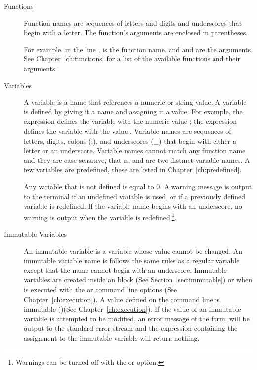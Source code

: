 \begin{description}

\item[Functions] Function names are sequences of letters and digits and underscores
\cmd{(\_)} that begin with a letter. The function's arguments are
enclosed in parentheses.

For example, in the line ,  is the
function name, and  and are the arguments. See
Chapter~\ref{ch:functions} for a list of the available functions and
their arguments.

\item[Variables] A variable is a name that references a numeric or string 
value. A variable is defined by giving it a name and assigning it a value. For 
example, the expression  defines the variable  with 
the numeric value ; the expression  
defines the variable  with the value . 
Variable names are sequences of letters, digits, colons (:), and underscores (\_) that begin 
with either a letter or an underscore. Variable names cannot match any function 
name and they are case-sensitive, that is,  and  
are two distinct variable names. A few variables are predefined, these are listed 
in  Chapter~\ref{ch:predefined}.

Any variable that is not defined is equal to 0. A warning message is
output to the terminal if an undefined variable is used, or if a
previously defined variable is redefined. If the variable
name begins with an underscore, no warning is output when the variable
is redefined.\footnote{Warnings can be turned off with the  or
 option.}.

\item[Immutable Variables]\label{immutable} An immutable variable is a
  variable whose value cannot be changed. An immutable variable name
  is follows the same rules as a regular variable except that the name
  cannot begin with an underscore.  Immutable variables are created
  inside an  block (See
  Section~\ref{sec:immutable}) or when \aprepro{} is executed with the
   or  command line options (See
  Chapter~\ref{ch:execution}). A value defined on the command line is
  immutable ()(See Chapter~\ref{ch:execution}). If the value of an
  immutable variable is attempted to be modified, an error message of
  the form:  will be output to the
  standard error stream and the expression containing the assignment
  to the immutable variable will return nothing.


\end{description}
